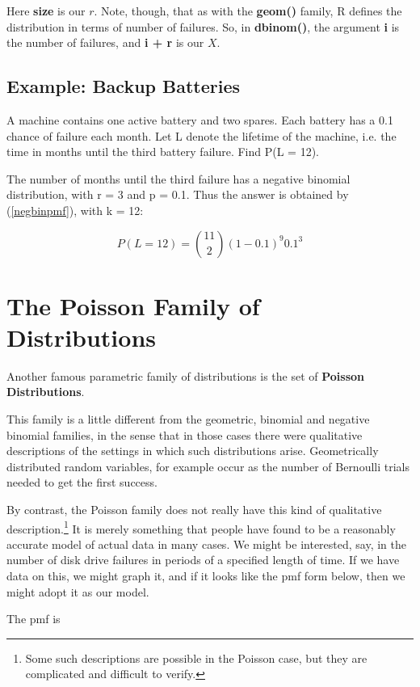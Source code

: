 Here {\bf size} is our $r$.  Note, though, that as with the {\bf geom()}
family, R defines the distribution in terms of number of failures.  So,
in {\bf dbinom()}, the argument {\bf i} is the number of failures, and
{\bf i + r} is our $X$.

\subsection{Example:  Backup Batteries}

A machine contains one active battery and two spares.  Each
battery has a 0.1 chance of failure each month.  Let L denote the
lifetime of the machine, i.e. the time in months until the third battery
failure.  Find P(L = 12).

The number of months until the third failure has a negative
binomial distribution, with r = 3 and p = 0.1.  Thus the answer is
obtained by (\ref{negbinpmf}), with k = 12:

\begin{equation}
P(L = 12) = \binom{11}{2} (1-0.1)^9 0.1^3
\end{equation}


\section{The Poisson Family of Distributions}
\label{poisfam}

Another famous parametric family of distributions is the set of {\bf
Poisson Distributions}.  

This family is a little different from the geometric, binomial and
negative binomial families, in the sense that in those cases there were
qualitative descriptions of the settings in which such distributions
arise.  Geometrically distributed random variables, for example occur as
the number of Bernoulli trials needed to get the first success.

By contrast, the Poisson family does not really have this kind of
qualitative description.\footnote{Some such descriptions are possible in
the Poisson case, but they are complicated and difficult to verify.} It
is merely something that people have found to be a reasonably accurate
model of actual data in many cases.  We might be interested, say, in the
number of disk drive failures in periods of a specified length of time.
If we have data on this, we might graph it, and if it looks like the pmf
form below, then we might adopt it as our model.

The pmf is

